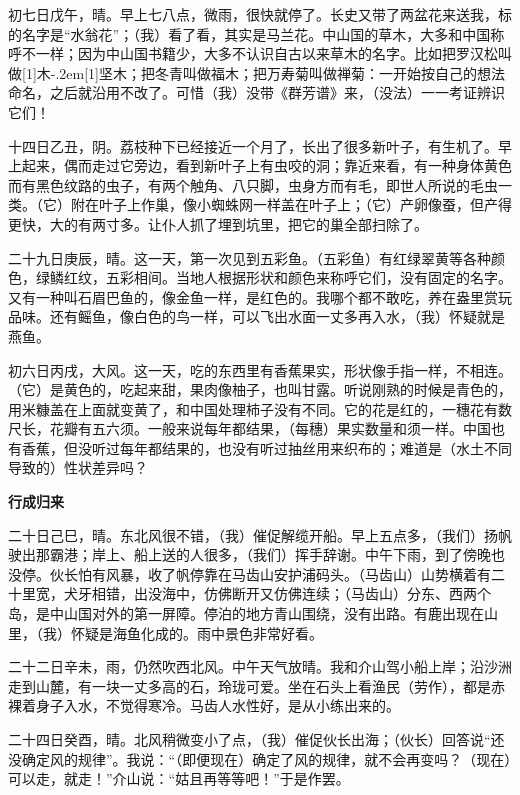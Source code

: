 \documentclass[12pt,UTF-8,openany]{ctexbook}
\begin{document}
\begin{normalsize}
    初七日戊午，晴。早上七八点，微雨，很快就停了。长史又带了两盆花来送我，标的名字是“水翁花”；（我）看了看，其实是马兰花。中山国的草木，大多和中国称呼不一样；因为中山国书籍少，大多不认识自古以来草木的名字。比如把罗汉松叫做\hbox{\scalebox{0.4}[1]{木}\kern-.2em\scalebox{0.75}[1]{坚}}木；把冬青叫做福木；把万寿菊叫做禅菊：一开始按自己的想法命名，之后就沿用不改了。可惜（我）没带《群芳谱》来，（没法）一一考证辨识它们！
    
    十四日乙丑，阴。荔枝种下已经接近一个月了，长出了很多新叶子，有生机了。早上起来，偶而走过它旁边，看到新叶子上有虫咬的洞；靠近来看，有一种身体黄色而有黑色纹路的虫子，有两个触角、八只脚，虫身方而有毛，即世人所说的毛虫一类。（它）附在叶子上作巢，像小蜘蛛网一样盖在叶子上；（它）产卵像蚕，但产得更快，大的有两寸多。让仆人抓了埋到坑里，把它的巢全部扫除了。
    
    二十九日庚辰，晴。这一天，第一次见到五彩鱼。（五彩鱼）有红绿翠黄等各种颜色，绿鳞红纹，五彩相间。当地人根据形状和颜色来称呼它们，没有固定的名字。又有一种叫石眉巴鱼的，像金鱼一样，是红色的。我哪个都不敢吃，养在盎里赏玩品味。还有鳐鱼，像白色的鸟一样，可以飞出水面一丈多再入水，（我）怀疑就是燕鱼。
    
    初六日丙戌，大风。这一天，吃的东西里有香蕉果实，形状像手指一样，不相连。（它）是黄色的，吃起来甜，果肉像柚子，也叫甘露。听说刚熟的时候是青色的，用米糠盖在上面就变黄了，和中国处理柿子没有不同。它的花是红的，一穗花有数尺长，花瓣有五六须。一般来说每年都结果，（每穗）果实数量和须一样。中国也有香蕉，但没听过每年都结果的，也没有听过抽丝用来织布的；难道是（水土不同导致的）性状差异吗？
    
    \begin{center}
        \textbf{行成归来}
    \end{center}
    
    二十日己巳，晴。东北风很不错，（我）催促解缆开船。早上五点多，（我们）扬帆驶出那霸港；岸上、船上送的人很多，（我们）挥手辞谢。中午下雨，到了傍晚也没停。伙长怕有风暴，收了帆停靠在马齿山安护浦码头。（马齿山）山势横着有二十里宽，犬牙相错，出没海中，仿佛断开又仿佛连续；（马齿山）分东、西两个岛，是中山国对外的第一屏障。停泊的地方青山围绕，没有出路。有鹿出现在山里，（我）怀疑是海鱼化成的。雨中景色非常好看。
    
    二十二日辛未，雨，仍然吹西北风。中午天气放晴。我和介山驾小船上岸；沿沙洲走到山麓，有一块一丈多高的石，玲珑可爱。坐在石头上看渔民（劳作），都是赤裸着身子入水，不觉得寒冷。马齿人水性好，是从小练出来的。
    
    二十四日癸酉，晴。北风稍微变小了点，（我）催促伙长出海；（伙长）回答说“还没确定风的规律”。我说：“（即便现在）确定了风的规律，就不会再变吗？（现在）可以走，就走！”介山说：“姑且再等等吧！”于是作罢。
    

\end{normalsize}
\end{document}
